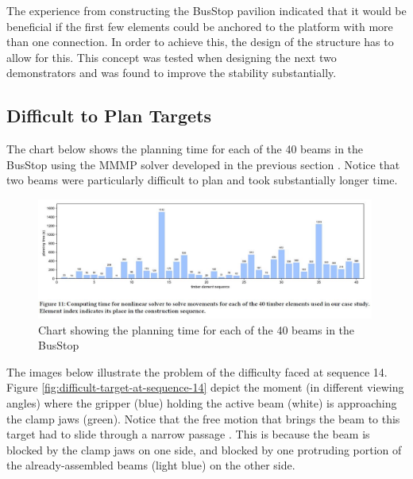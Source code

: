 The experience from constructing the BusStop pavilion indicated that it would be beneficial if the first few elements could be anchored to the platform with more than one connection. In order to achieve this, the design of the structure has to allow for this. This concept was tested when designing the next two demonstrators and was found to improve the stability substantially.

\subsection{Difficult to Plan Targets}
\label{subsection:exploration-3-difficult-to-plan-targets}

The chart below \parencite{huangNewAnalogProtocol2021} shows the planning time for each of the 40 beams in the BusStop using the MMMP solver developed in the previous section . Notice that two beams were particularly difficult to plan and took substantially longer time. 

\begin{figure}[!h]
    \centering
    \includegraphics[width=0.99\textwidth]{images/6b/img18.jpg}
    \caption{Chart showing the planning time for each of the 40 beams in the BusStop}
    \label{fig:planning-time-for-each-beam}
\end{figure}

The images below illustrate the problem of the difficulty faced at sequence 14. Figure \ref{fig:difficult-target-at-sequence-14} depict the moment (in different viewing angles) where the gripper (blue) holding the active beam (white) is approaching the clamp jaws (green). Notice that the free motion that brings the beam to this target had to slide through a narrow passage . This is because the beam is blocked by the clamp jaws on one side, and blocked by one protruding portion of the already-assembled beams (light blue) on the other side.

